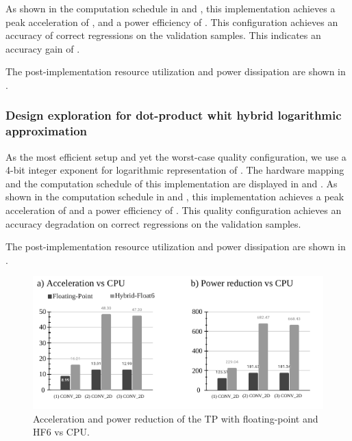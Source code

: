 As shown in the computation schedule in  and , this implementation achieves a peak acceleration of , and a power efficiency of . This configuration achieves an accuracy of  correct regressions on the  validation samples. This indicates an accuracy gain of .

The post-implementation resource utilization and power dissipation are shown in .


\subsubsection{Design exploration for dot-product whit hybrid logarithmic approximation}
As the most efficient setup and yet the worst-case quality configuration, we use a 4-bit integer exponent for logarithmic representation of . The hardware mapping and the computation schedule of this implementation are displayed in  and . As shown in the computation schedule in  and , this implementation achieves a peak acceleration of  and a power efficiency of . This quality configuration achieves an accuracy degradation  on correct regressions on the  validation samples.

The post-implementation resource utilization and power dissipation are shown in .

\begin{figure}[t!]
	\centering
	\includegraphics[width=1\columnwidth]{../figures/power_breakdown/acceleration_power_reduction.pdf}
	\caption{Acceleration and power reduction of the TP with floating-point and HF6 vs CPU.}
	\label{fig:ACCELERATION}
\end{figure}

